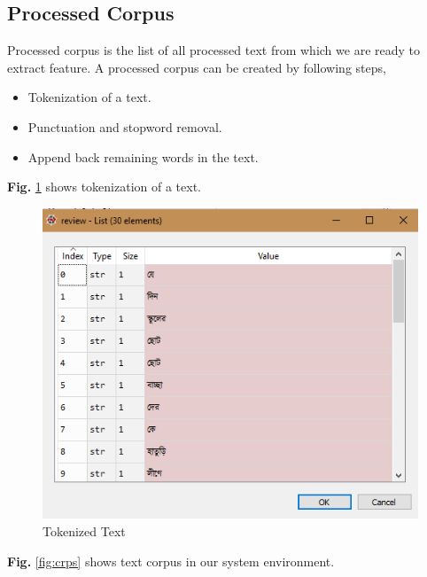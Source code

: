 \documentclass[12pt,a4paper]{report}
\begin{document}
\subsection{Processed Corpus}
Processed corpus is the list of all processed text from which we are ready to extract feature. A processed corpus can be created by following steps,
\begin{itemize}
    \item Tokenization of a text.
    \item Punctuation and stopword removal.
    \item Append back remaining words in the text.
\end{itemize}
\textbf{Fig.} \ref{fig:tkn} shows tokenization of a text.
\begin{figure}[h!]
    \centering
    \includegraphics[scale=0.6]{Figures/tokenize.PNG}
    \caption{Tokenized Text}
    \label{fig:tkn}
\end{figure}
\par\noindent
\textbf{Fig.} \ref{fig:crps} shows text corpus in our system environment.
\end{document}

